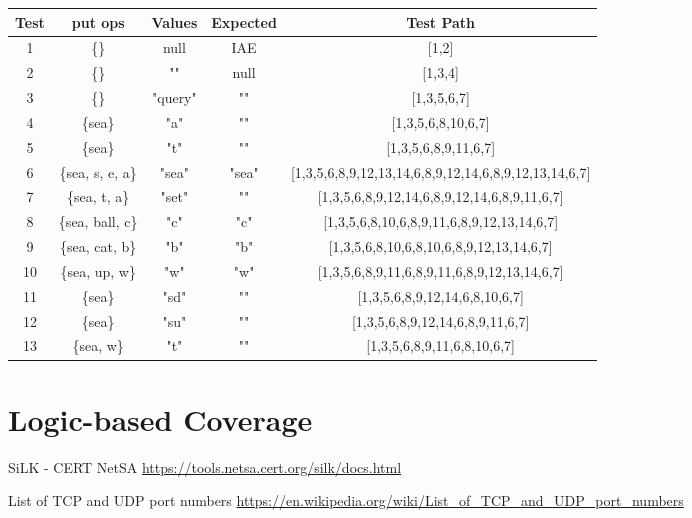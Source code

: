 \documentclass[12pt]{article}
\begin{document}
\begin{table}[htb]
\centering
\begin{tabular}{| c | c | c | c | c |} 
 \hline
 \textbf{Test} & \textbf{put ops} & \textbf{Values} & \textbf{Expected} & \textbf{Test Path} \\ \hline
 1             & \{\}              & null            & IAE               & [1,2]\\ \hline
 2             & \{\}              & ""              & null              & [1,3,4]\\ \hline
 3             & \{\}              & "query"         & ""                & [1,3,5,6,7]\\ \hline
 4             & \{sea\}           & "a"             & ""                & [1,3,5,6,8,10,6,7]\\ \hline
 5             & \{sea\}           & "t"             & ""                & [1,3,5,6,8,9,11,6,7]\\ \hline
 6             & \{sea, s, e, a\}  & "sea"           & "sea"             & [1,3,5,6,8,9,12,13,14,6,8,9,12,14,6,8,9,12,13,14,6,7]\\ \hline
 7             & \{sea, t, a\}     & "set"           & ""                & [1,3,5,6,8,9,12,14,6,8,9,12,14,6,8,9,11,6,7]\\ \hline
 8             & \{sea, ball, c\}  & "c"             & "c"               & [1,3,5,6,8,10,6,8,9,11,6,8,9,12,13,14,6,7]\\ \hline
 9             & \{sea, cat, b\}   & "b"             & "b"               & [1,3,5,6,8,10,6,8,10,6,8,9,12,13,14,6,7]\\ \hline
 10            & \{sea, up, w\}    & "w"             & "w"               & [1,3,5,6,8,9,11,6,8,9,11,6,8,9,12,13,14,6,7]\\ \hline
 11            & \{sea\}           & "sd"            & ""                & [1,3,5,6,8,9,12,14,6,8,10,6,7]\\ \hline
 12            & \{sea\}           & "su"            & ""                & [1,3,5,6,8,9,12,14,6,8,9,11,6,7]\\ \hline
 13            & \{sea, w\}        & "t"             & ""                & [1,3,5,6,8,9,11,6,8,10,6,7]\\ \hline
\end{tabular}
\end{table}


\section{Logic-based Coverage}





\begin{thebibliography}{9}
SiLK - CERT NetSA
\url{https://tools.netsa.cert.org/silk/docs.html}

List of TCP and UDP port numbers
\url{https://en.wikipedia.org/wiki/List_of_TCP_and_UDP_port_numbers}



\end{thebibliography}



\end{document}
